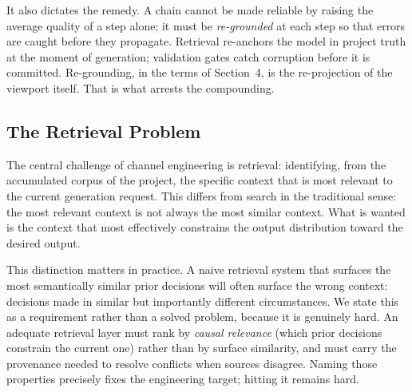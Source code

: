 \documentclass[11pt, a4paper]{article}
\begin{document}
It also dictates the remedy. A chain cannot be made reliable by raising the average
quality of a step alone; it must be \emph{re-grounded} at each step so that errors are
caught before they propagate. Retrieval re-anchors the model in project truth at the
moment of generation; validation gates catch corruption before it is committed.
Re-grounding, in the terms of Section~4, is the re-projection of the viewport itself.
That is what arrests the compounding.

\subsection{The Retrieval Problem}

The central challenge of channel engineering is retrieval: identifying, from the
accumulated corpus of the project, the specific context that is most relevant to the
current generation request. This differs from search in the traditional sense: the most
relevant context is not always the most similar context. What is wanted is the context
that most effectively constrains the output distribution toward the desired output.

This distinction matters in practice. A naive retrieval system that surfaces the most
semantically similar prior decisions will often surface the wrong context: decisions made
in similar but importantly different circumstances. We state this as a requirement rather
than a solved problem, because it is genuinely hard. An adequate retrieval layer must rank
by \emph{causal relevance} (which prior decisions constrain the current one) rather than
by surface similarity, and must carry the provenance needed to resolve conflicts when
sources disagree. Naming those properties precisely fixes the engineering target;
hitting it remains hard.
\end{document}
